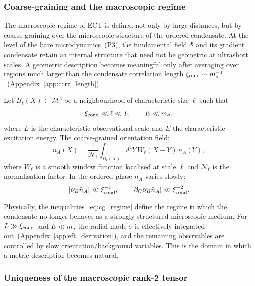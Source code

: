 \subsubsection*{Coarse-graining and the macroscopic regime}

The macroscopic regime of ECT is defined not only by large distances,
but by coarse-graining over the microscopic structure of the ordered
condensate.
At the level of the bare microdynamics~(P3), the fundamental field
$\Phi$ and its gradient condensate retain an internal structure that
need not be geometric at ultrashort scales.
A geometric description becomes meaningful only after averaging over
regions much larger than the condensate correlation length
$\xi_{\rm cond}\sim m_\sigma^{-1}$~(Appendix~\ref{app:corr_length}).

Let $B_\ell(X)\subset\mathcal{M}^4$ be a neighbourhood of
characteristic size $\ell$ such that
\begin{equation}
  \label{eq:cg_regime}
  \xi_{\rm cond}\ll\ell\ll L,
  \qquad
  E\ll m_\sigma,
\end{equation}
where $L$ is the characteristic observational scale and $E$ the
characteristic excitation energy.
The coarse-grained orientation field:
\begin{equation}
  \label{eq:coarse_grained_n}
  \bar{n}_A(X)
  = \frac{1}{\mathcal{N}_\ell}
    \int_{B_\ell(X)}d^4Y\,W_\ell(X-Y)\,n_A(Y),
\end{equation}
where $W_\ell$ is a smooth window function localised at scale $\ell$
and $\mathcal{N}_\ell$ is the normalisation factor.
In the ordered phase $\bar{n}_A$ varies slowly:
\begin{equation}
  \label{eq:slow_orientation}
  |\partial_B\bar{n}_A|\ll\xi_{\rm cond}^{-1},
  \qquad
  |\partial_C\partial_B\bar{n}_A|\ll\xi_{\rm cond}^{-2}.
\end{equation}

Physically, the inequalities~\eqref{eq:cg_regime} define the regime
in which the condensate no longer behaves as a strongly structured
microscopic medium.
For $L\gg\xi_{\rm cond}$ and $E\ll m_\sigma$ the radial mode $\sigma$
is effectively integrated out~(Appendix~\ref{app:eft_derivation}),
and the remaining observables are controlled by slow orientation/background
variables.
This is the domain in which a metric description becomes natural.

\subsubsection*{Uniqueness of the macroscopic rank-2 tensor}

